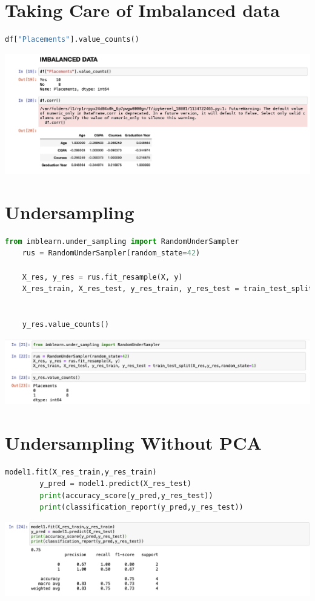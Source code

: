 \documentclass{article}
\begin{document}
\section{Taking Care of Imbalanced data}
\begin{lstlisting}[language = Python]
	df["Placements"].value_counts()
\end{lstlisting}
\includegraphics[scale=0.4]{images/8.png}

\section{Undersampling}
\begin{lstlisting}[language=Python]
	from imblearn.under_sampling import RandomUnderSampler
	rus = RandomUnderSampler(random_state=42)
	
	X_res, y_res = rus.fit_resample(X, y)
	X_res_train, X_res_test, y_res_train, y_res_test = train_test_split(X_res,y_res,random_state=1)
	
	
	y_res.value_counts()
\end{lstlisting}
\includegraphics[scale=0.4]{images/9.png}
\section{Undersampling Without PCA}
\begin{lstlisting}[language=Python]
		model1.fit(X_res_train,y_res_train)
		y_pred = model1.predict(X_res_test)
		print(accuracy_score(y_pred,y_res_test))
		print(classification_report(y_pred,y_res_test))
\end{lstlisting}
\includegraphics[scale=0.45]{images/10.png}
\end{document}
